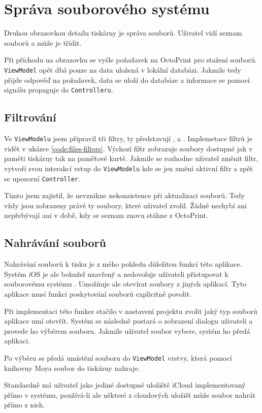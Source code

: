 \section{Správa souborového systému}

Druhou obrazovkou detailu tiskárny je správa souborů.
Uživatel vidí seznam souborů a může je třídit.

Při příchodu na obrazovku se vyšle požadavek na OctoPrint pro stažení souborů.
\texttt{ViewModel} opět dbá pouze na data uložená v lokální databázi.
Jakmile tedy přijde odpověď na požadavek, data se uloží do databáze a informace se pomocí signálu propaguje do \texttt{Controlleru}.

\subsection{Filtrování}

Ve \texttt{ViewModelu} jsem připravil tři filtry, ty představují ,  a .
Implemetace filtrů je vidět v ukázce \ref{code:files-filters}.
Výchozí filtr zobrazuje soubory dostupné jak v paměti tiskárny tak na paměťové kartě.
Jakmile se rozhodne uživatel změnit filtr, vytvoří svou interakcí vstup do \texttt{ViewModelu} kde se jen změní aktivní filtr a zpět se upozorní \texttt{Controller}.


Tímto jsem zajistil, že nevznikne nekonzistence při aktualizaci souborů.
Tedy vždy jsou zobrazeny právě ty soubory, které uživatel zvolil.
Žádné nechybí ani nepřebývají ani v době, kdy se seznam znovu stáhne z OctoPrint.

\subsection{Nahrávání souborů}

Nahrávání souborů k tisku je z mého pohledu důležitou funkcí této aplikace.
Systém iOS je ale bohužel uzavřený a nedovoluje uživateli přistupovat k souborovému systému \cite{imobile-access-fs}.
Umožňuje ale otevírat soubory z jiných aplikací.
Tyto aplikace musí funkci poskytování souborů explicitně povolit.

Při implementaci této funkce stačilo v nastavení projektu zvolit jaký typ souborů aplikace umí otevřít.
Systém se následně postará o zobrazení dialogu uživateli a provede ho výběrem souboru.
Jakmile uživatel soubor vybere, systém ho předá aplikaci.


\bigskip{}

Po výběru se předá umístění souboru do \texttt{ViewModel} vrstvy, která pomocí knihovny Moya soubor do tiskárny nahraje.

Standardně má uživatel jako jediné dostupné uložiště iCloud implementovaný přímo v systému, používá-li ale některé z cloudových uložišť může soubor nahrát přímo z nich.
